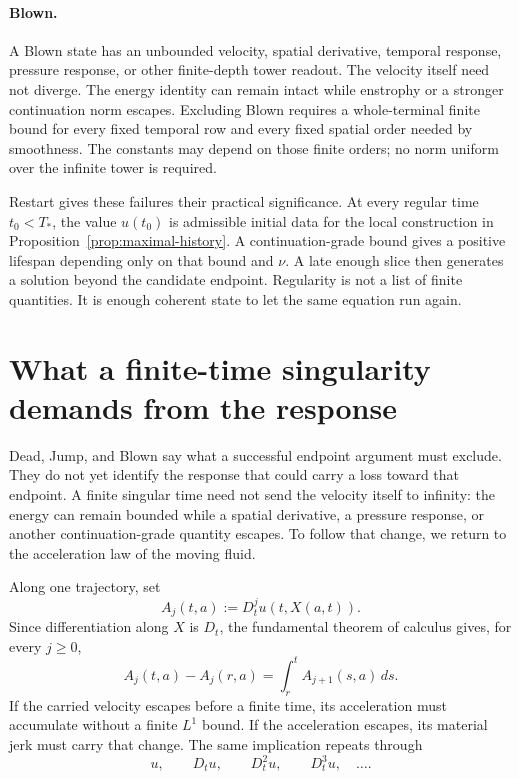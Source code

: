 \paragraph{Blown.}
A Blown state has an unbounded velocity, spatial derivative, temporal
response, pressure response, or other finite-depth tower readout.  The velocity
itself need not diverge.  The energy identity can remain intact while
enstrophy or a stronger continuation norm escapes.  Excluding Blown requires a
whole-terminal finite bound for every fixed temporal row and every fixed
spatial order needed by smoothness.  The constants may depend on those finite
orders; no norm uniform over the infinite tower is required.

Restart gives these failures their practical significance.  At every regular
time \(t_0<T_*\), the value \(u(t_0)\) is admissible initial data for the local
construction in Proposition~\ref{prop:maximal-history}.  A continuation-grade
bound gives a positive lifespan depending only on that bound and \(\nu\).  A
late enough slice then generates a solution beyond the candidate endpoint.
Regularity is not a list of finite quantities.  It is enough coherent state
to let the same equation run again.

\section{What a finite-time singularity demands from the response}
\label{sec:singularity-tower-preview}

Dead, Jump, and Blown say what a successful endpoint argument must exclude.
They do not yet identify the response that could carry a loss toward that
endpoint.  A finite singular time need not send the velocity itself to
infinity: the energy can remain bounded while a spatial derivative, a pressure
response, or another continuation-grade quantity escapes.  To follow that
change, we return to the acceleration law of the moving fluid.

Along one trajectory, set
\begin{equation*}
 A_j(t,a):=D_t^ju(t,X(a,t)).
\end{equation*}
Since differentiation along \(X\) is \(D_t\), the fundamental theorem of
calculus gives, for every \(j\ge0\),
\begin{equation*}
 A_j(t,a)-A_j(r,a)
 =\int_r^t A_{j+1}(s,a)\,ds.
\end{equation*}
If the carried velocity escapes before a finite time, its acceleration must
accumulate without a finite \(L^1\) bound.  If the acceleration escapes, its
material jerk must carry that change.  The same implication repeats through
\begin{equation*}
 u,\qquad D_tu,\qquad D_t^2u,\qquad D_t^3u,\quad\ldots.
\end{equation*}

